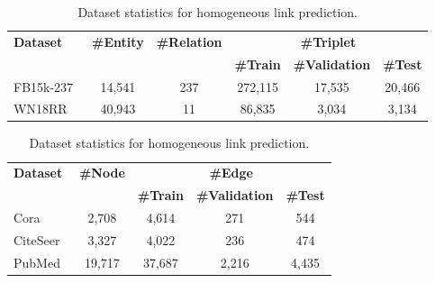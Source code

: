 \begin{table}[!h]
    \begin{minipage}[t]{0.58\textwidth}
        \centering
        \caption{Dataset statistics for knowledge graph completion.}
        \label{tab:kg_statistics}
        \begin{adjustbox}{max width=\textwidth}
            \begin{tabular}{lccccc}
                \toprule
                \multirow{2}{*}{\bf{Dataset}} & \multirow{2}{*}{\bf{\#Entity}} & \multirow{2}{*}{\bf{\#Relation}} & \multicolumn{3}{c}{\bf{\#Triplet}} \\
                & & & \bf{\#Train} & \bf{\#Validation} & \bf{\#Test} \\
                \midrule
                FB15k-237~\cite{toutanova2015observed} & 14,541 & 237 & 272,115 & 17,535 & 20,466 \\
                WN18RR~\cite{dettmers2018convolutional} & 40,943 & 11 & 86,835 & 3,034 & 3,134 \\
                \bottomrule
            \end{tabular}
        \end{adjustbox}
    \end{minipage}
    \hspace{0.3em}
    \begin{minipage}[t]{0.42\textwidth}
        \centering
        \caption{Dataset statistics for homogeneous link prediction.}
        \label{tab:homo_statistics}
        \begin{adjustbox}{max width=\textwidth}
            \begin{tabular}{lcccc}
                \toprule
                \multirow{2}{*}{\bf{Dataset}} & \multirow{2}{*}{\bf{\#Node}} & \multicolumn{3}{c}{\bf{\#Edge}} \\
                & & \bf{\#Train} & \bf{\#Validation} & \bf{\#Test} \\
                \midrule
                Cora~\cite{sen2008collective} & 2,708 & 4,614 & 271 & 544 \\
                CiteSeer~\cite{sen2008collective} & 3,327 & 4,022 & 236 & 474 \\
                PubMed~\cite{sen2008collective} & 19,717 & 37,687 & 2,216 & 4,435 \\
                \bottomrule
            \end{tabular}
        \end{adjustbox}
    \end{minipage}
\end{table}

